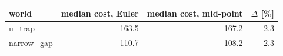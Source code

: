 \begin{tabular}{lrrr}
  \toprule
  world & median cost, Euler & median cost, mid-point & $\Delta$ [\%] \\
  \midrule
  u\_trap & 163.5 & 167.2 & -2.3 \\
  narrow\_gap & 110.7 & 108.2 & 2.3 \\
  \bottomrule
\end{tabular}
